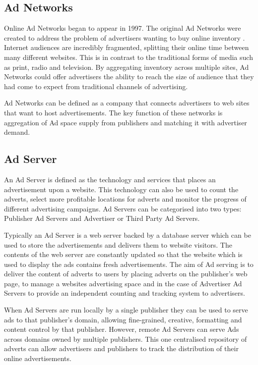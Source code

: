 \documentclass[12pt]{article}
\begin{document}
\subsection{Ad Networks} \label{AdNetwork}
Online Ad Networks began to appear in 1997. The original Ad Networks were created to address the problem of advertisers wanting to buy online inventory \parencite{adExchanges}. Internet audiences are incredibly fragmented, splitting their online time between many different websites. This is in contrast to the traditional forms of media such as print, radio and television. By aggregating inventory across multiple sites, Ad Networks could offer advertisers the ability to reach the size of audience that they had come to expect from traditional channels of advertising. \newline

Ad Networks can be defined as a company that connects advertisers to web sites that want to host advertisements. The key function of these networks is aggregation of Ad space supply from publishers and matching it with advertiser demand. 

\subsection{Ad Server}
An Ad Server is defined as the technology and services that places an advertisement upon a website. This technology can also be used to count the adverts, select more profitable locations for adverts and monitor the progress of different advertising campaigns. Ad Servers can be categorised into two types: Publisher Ad Servers and Advertiser or Third Party Ad Servers. \newline 

Typically an Ad Server is a web server backed by a database server which can be used to store the advertisements and delivers them to website visitors. The contents of the web server are constantly updated so that the website which is used to display the ads contains fresh advertisements. The aim of Ad serving is to deliver the content of adverts to users by placing adverts on the publisher's web page, to manage a websites advertising space and in the case of Advertiser Ad Servers to provide an independent counting and tracking system to advertisers. \newline 

When Ad Servers are run locally by a single publisher they can be used to serve ads to that publisher's domain, allowing fine-grained, creative, formatting and content control by that publisher. However, remote Ad Servers can serve Ads across domains owned by multiple publishers. This one centralised repository of adverts can allow advertisers and publishers to track the distribution of their online advertisements. 
\end{document}
